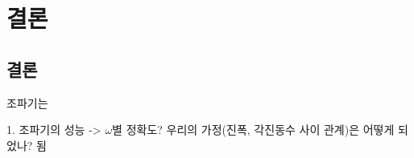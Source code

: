 \section{결론}
\subsection{결론}

조파기는 

1. 조파기의 성능 ->
$\omega$별 정확도?
우리의 가정(진폭, 각진동수 사이 관계)은 어떻게 되었나?
됨